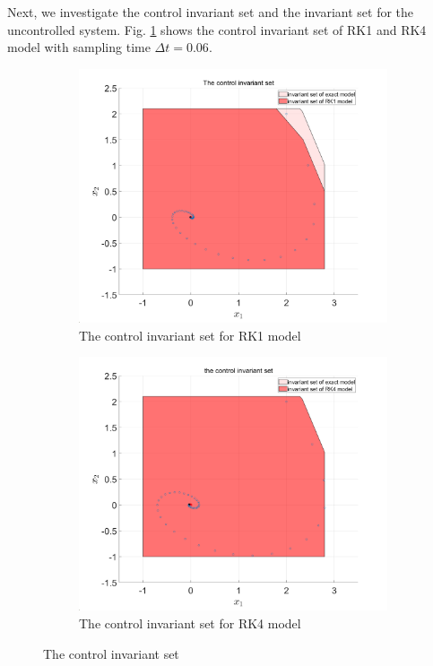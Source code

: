 Next, we investigate the control invariant set and the invariant set for the uncontrolled system. Fig. \ref{fig:coninvesetrk1} shows the control invariant set of RK1 and RK4 model with sampling time $\Delta t = 0.06$.
\begin{figure}[H]
	\centering
	\begin{subfigure}[b]{0.37\textwidth}
		\centering
		\includegraphics[width=\linewidth]{pics/coninvset0.06.png}
		\caption{The control invariant set for RK1 model}
		\label{fig:coninvesetrk1}
	\end{subfigure}
	\hfill
	\begin{subfigure}[b]{0.37\textwidth}
		\includegraphics[width=\linewidth]{pics/CONINVSETRK40.06.png}
		\caption{The control invariant set for RK4 model}
		\label{fig:coninvesetrk4}
	\end{subfigure}
    \caption{The control invariant set}
	\label{The control invariant set}
\end{figure}

